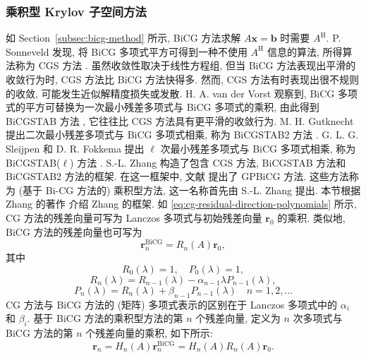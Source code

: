 \subsubsection{{乘积型 Krylov 子空间方法}}\label{subsec:product-type-krylov}
{如 Section\ \ref{subsec:bicg-method} 所示, BiCG 方法求解 $A\bm x=\bm b$ 时需要 $A^{\mathrm H}$. P. Sonneveld 发现, 将 BiCG 多项式平方可得到一种不使用 $A^{\mathrm H}$ 信息的算法, 所得算法称为 CGS 方法 . 虽然收敛性取决于线性方程组, 但当 BiCG 方法表现出平滑的收敛行为时, CGS 方法比 BiCG 方法快得多. 然而, CGS 方法有时表现出很不规则的收敛, 可能发生近似解精度损失或发散. H. A. van der Vorst 观察到, BiCG 多项式的平方可替换为一次最小残差多项式与 BiCG 多项式的乘积, 由此得到 BiCGSTAB 方法 , 它往往比 CGS 方法具有更平滑的收敛行为. M. H. Gutknecht 提出二次最小残差多项式与 BiCG 多项式相乘, 称为 BiCGSTAB2 方法 . G. L. G. Sleijpen 和 D. R. Fokkema 提出 $\ell$ 次最小残差多项式与 BiCG 多项式相乘, 称为 BiCGSTAB($\ell$) 方法 . S.-L. Zhang 构造了包含 CGS 方法, BiCGSTAB 方法和 BiCGSTAB2 方法的框架. 在这一框架中, 文献  提出了 GPBiCG 方法. 这些方法称为 (基于 Bi-CG 方法的) 乘积型方法, 这一名称首先由 S.-L. Zhang 提出.}
{本节根据 Zhang 的著作  介绍 Zhang 的框架.}
{如 \eqref{eq:cg-residual-direction-polynomials} 所示, CG 方法的残差向量可写为 Lanczos 多项式与初始残差向量 $\bm r_0$ 的乘积. 类似地, BiCG 方法的残差向量也可写为}
\[\bm r_n^{\mathrm{BiCG}}=R_n(A)\bm r_0,\]
{其中}
\begin{equation}\label{eq:product-bicg-polynomials-initial}R_0(\lambda)=1,\quad P_0(\lambda)=1,\end{equation}
\begin{equation}\label{eq:product-bicg-residual-polynomial}R_n(\lambda)=R_{n-1}(\lambda)-\alpha_{n-1}\lambda P_{n-1}(\lambda),\end{equation}
\begin{equation}\label{eq:product-bicg-direction-polynomial}P_n(\lambda)=R_n(\lambda)+\beta_{n-1}P_{n-1}(\lambda)\quad n=1,2,\ldots\end{equation}
{CG 方法与 BiCG 方法的 (矩阵) 多项式表示的区别在于 Lanczos 多项式中的 $\alpha_i$ 和 $\beta_i$. 基于 BiCG 方法的乘积型方法的第 $n$ 个残差向量, 定义为 $n$ 次多项式与 BiCG 方法的第 $n$ 个残差向量的乘积, 如下所示:}
\begin{equation}\label{eq:product-residual-polynomial}\bm r_n=H_n(A)\bm r_n^{\mathrm{BiCG}}=H_n(A)R_n(A)\bm r_0.\end{equation}
